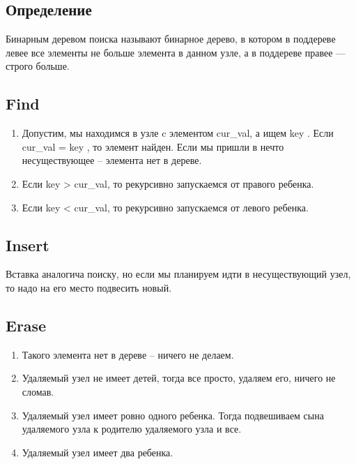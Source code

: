 \subsection*{Определение}

\Def Бинарным деревом поиска называют бинарное дерево, в котором
в поддереве левее все элементы не больше элемента в данном узле, а
в поддереве правее — строго больше.


\subsection*{Find}

\Alg

\begin{enumerate}
    \item Допустим, мы находимся в узле c элементом cur\_val, а ищем key . Если cur\_val = key , то элемент найден. Если мы пришли в нечто несуществующее -- элемента нет в дереве.
    \item Если key > cur\_val, то рекурсивно запускаемся от правого ребенка.
    \item Если key < cur\_val, то рекурсивно запускаемся от левого ребенка.
\end{enumerate}

\subsection*{Insert}

Вставка аналогича поиску, но если мы планируем идти в
несуществующий узел, то надо на его место подвесить новый.

\subsection*{Erase}

\Alg

\begin{enumerate}
    \item Такого элемента нет в дереве -- ничего не делаем.
    \item Удаляемый узел не имеет детей, тогда все просто, удаляем его, ничего не сломав.
    \item Удаляемый узел имеет ровно одного ребенка. Тогда подвешиваем сына удаляемого узла к родителю удаляемого узла и все.
    \item Удаляемый узел имеет два ребенка.
\end{enumerate}

